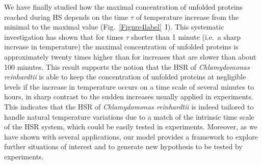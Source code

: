 \documentclass[oneside, 10pt, a4paper, twocolumn]{article}
\begin{document}
{We have finally studied} how the maximal concentration of unfolded proteins reached during HS depends on the time $\tau$ of temperature increase from the minimal to the maximal value (Fig.~\ref{Figure4label}~I). This systematic investigation has shown that  for times $\tau$ shorter than 1 minute (i.e.~a sharp increase in temperature) the maximal concentration of unfolded proteins is 
approximately twenty times higher than for increases that are slower than about 100 minutes.
This {result} supports the notion that the HSR of \emph{Chlamydomonas {reinhardtii}} is able to keep the concentration of unfolded proteins at
negligible levels if the increase in temperature occurs on a time scale of several minutes to hours, in sharp contrast to the sudden increases usually applied in experiments. %
This indicates that the HSR of \emph{Chlamydomonas {reinhardtii}} is indeed {tailored to handle} natural temperature variations due to a match of the intrinsic time scale of the HSR system, which could be easily tested in experiments. 
Moreover, as we have shown with several applications, our model provides a framework to explore further situations of interest and to generate new hypothesis to be tested by experiments.

\end{document}
